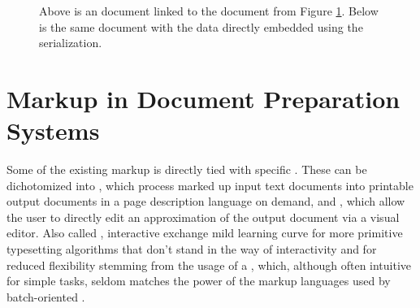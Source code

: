 \documentclass[a5paper,10pt]{book}
\begin{document}
\begin{figure}
  \label{fig:rdf-doc}
  
\end{figure}

\begin{figure}[t!]
  \caption{Above is an  document linked to the 
    document from Figure \ref{fig:rdf-doc}. Below is the same 
    document with the  data directly embedded using the
     serialization.}\bigskip
\end{figure}

        
\section{Markup in Document Preparation Systems}
Some of the existing markup is directly tied with specific . These
 can be dichotomized into %
, which process marked up input
text documents into printable output documents in a page description language on
demand, and , which
allow the user to directly edit an approximation of the output document via a
visual editor. Also called , interactive  exchange
mild learning curve for more primitive typesetting algorithms that don't stand
in the way of interactivity and for reduced flexibility stemming from the usage
of a , which, although often intuitive for simple tasks, seldom
matches the power of the markup languages used by batch-oriented .
\end{document}

